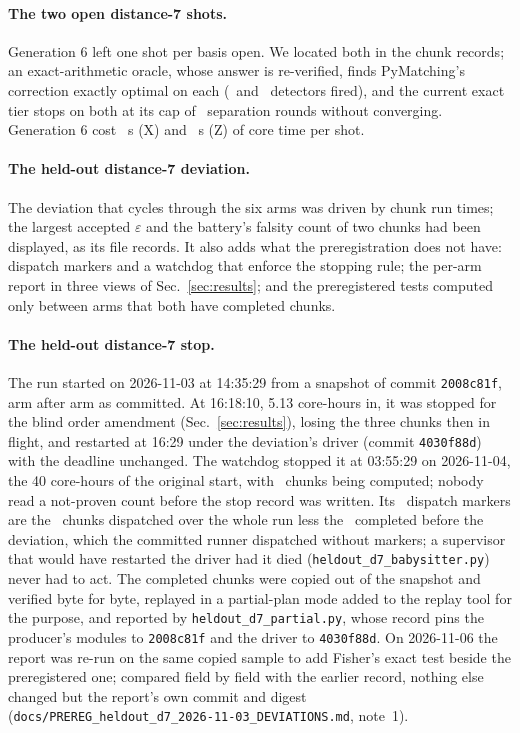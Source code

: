\documentclass[aps,pra,twocolumn,superscriptaddress,nofootinbib,longbibliography,floatfix]{revtex4-2}
\newcommand{\eps}{\varepsilon}
\begin{document}
\paragraph*{The two open distance-7 shots.} Generation 6 left one shot per basis open. We located both in the chunk records; an exact-arithmetic oracle, whose answer is re-verified, finds PyMatching's correction exactly optimal on each (\HwResidualDetectorsX\ and \HwResidualDetectorsZ\ detectors fired), and the current exact tier stops on both at its cap of \HwResidualRounds\ separation rounds without converging. Generation 6 cost \HwCoreSecX\ s (X) and \HwCoreSecZ\ s (Z) of core time per shot.

\paragraph*{The held-out distance-7 deviation.} The deviation that cycles through the six arms was driven by chunk run times; the largest accepted $\eps$ and the battery's falsity count of two chunks had been displayed, as its file records. It also adds what the preregistration does not have: dispatch markers and a watchdog that enforce the stopping rule; the per-arm report in three views of Sec.~\ref{sec:results}; and the preregistered tests computed only between arms that both have completed chunks.

\paragraph*{The held-out distance-7 stop.} The run started on 2026-11-03 at 14:35:29 from a snapshot of commit \texttt{2008c81f}, arm after arm as committed. At 16:18:10, 5.13 core-hours in, it was stopped for the blind order amendment (Sec.~\ref{sec:results}), losing the three chunks then in flight, and restarted at 16:29 under the deviation's driver (commit \texttt{4030f88d}) with the deadline unchanged. The watchdog stopped it at 03:55:29 on 2026-11-04, the 40 core-hours of the original start, with \HoDSevenUnfinishedChunks\ chunks being computed; nobody read a not-proven count before the stop record was written. Its \HoDSevenMarkers\ dispatch markers are the \HoDSevenDispatched\ chunks dispatched over the whole run less the \HoDSevenPreDeviationChunks\ completed before the deviation, which the committed runner dispatched without markers; a supervisor that would have restarted the driver had it died (\nolinkurl{heldout_d7_babysitter.py}) never had to act. The completed chunks were copied out of the snapshot and verified byte for byte, replayed in a partial-plan mode added to the replay tool for the purpose, and reported by \nolinkurl{heldout_d7_partial.py}, whose record pins the producer's modules to \texttt{2008c81f} and the driver to \texttt{4030f88d}. On 2026-11-06 the report was re-run on the same copied sample to add Fisher's exact test beside the preregistered one; compared field by field with the earlier record, nothing else changed but the report's own commit and digest (\nolinkurl{docs/PREREG_heldout_d7_2026-11-03_DEVIATIONS.md}, note~1).
\end{document}
